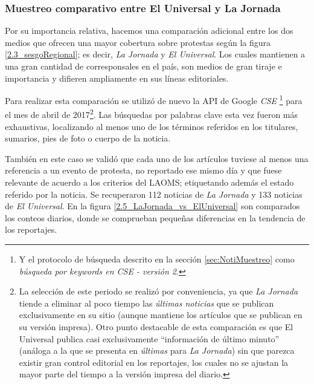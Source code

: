 \documentclass[letterpaper, 11pt]{book}
\theoremstyle{definition}
\theoremstyle{remark}
\begin{document}
\subsubsection{Muestreo comparativo entre El Universal y La Jornada}
\label{sec:Mediosnacionales_Comparacion_UniversalJornada}


Por su importancia relativa, hacemos una comparación adicional entre los dos medios que ofrecen una mayor cobertura sobre protestas según la figura \ref{2.3_sesgoRegional}; es decir, \emph{La Jornada} y \emph{El Universal}. Los cuales mantienen a una gran cantidad de corresponsales en el país, son medios de gran tiraje e importancia y difieren ampliamente en sus líneas editoriales.

Para realizar esta comparación se utilizó de nuevo la API de Google \emph{CSE} \footnote{
    Y el protocolo de búsqueda descrito en la sección \ref{sec:NotiMuestreo} como \emph{búsqueda por keywords en CSE - versión 2}. 
} 
para el mes de abril de 2017\footnote{
    La selección de este periodo se realizó por conveniencia, ya que \emph{La Jornada} tiende a eliminar al poco tiempo las \emph{últimas noticias} que se publican exclusivamente en su sitio (aunque mantiene los artículos que se publican en su versión impresa). 
    Otro punto destacable de esta comparación es que El Universal publica casi exclusivamente ``información de último minuto'' (análoga a la que se presenta en \emph{últimas} para \emph{La Jornada}) sin que parezca existir gran control editorial en los reportajes, los cuales no se ajustan la mayor parte del tiempo a la versión impresa del diario.
}. 
Las búsquedas por palabras clave esta vez fueron más exhaustivas, localizando al menos uno de los términos referidos en los titulares, sumarios, pies de foto o cuerpo de la noticia.

También en este caso se validó que cada uno de los artículos tuviese al menos una referencia a un evento de protesta, no reportado ese mismo día y que fuese relevante de acuerdo a los criterios del LAOMS; etiquetando además el estado referido por la noticia. Se recuperaron 112 noticias de \emph{La Jornada} y 133 noticias de \emph{El Universal}. En la figura \ref{2.5_LaJornada_vs_ElUniversal} son comparados los conteos diarios, donde se comprueban pequeñas diferencias en la tendencia de los reportajes.
\end{document}
